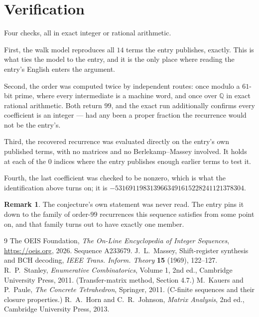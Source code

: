 \documentclass[11pt,a4paper]{article}
\theoremstyle{plain}
\theoremstyle{definition}
\newtheorem{remark}[theorem]{Remark}
\begin{document}
\section{Verification}

Four checks, all in exact integer or rational arithmetic.

First, the walk model reproduces all $14$ terms the entry publishes, exactly. This is
what ties the model to the entry, and it is the only place where reading the entry's English
enters the argument.

Second, the order was computed twice by independent routes: once modulo a $61$-bit prime, where
every intermediate is a machine word, and once over $\mathbb{Q}$ in exact rational arithmetic.
Both return $99$, and the exact run additionally confirms every coefficient is an integer
--- had any been a proper fraction the recurrence would not be the entry's.

Third, the recovered recurrence was evaluated directly on the entry's own published terms, with
no matrices and no Berlekamp--Massey involved. It holds at each of the $0$ indices where
the entry publishes enough earlier terms to test it.

Fourth, the last coefficient was checked to be nonzero, which is what the identification above
turns on; it is $-5316911983139663491615228241121378304$.

\begin{remark}
The conjecture's own statement was never read. The entry pins it down to the family of
order-$99$ recurrences this sequence satisfies from some point on, and that family turns
out to have exactly one member.
\end{remark}

\begin{thebibliography}{9}
 The OEIS Foundation, \emph{The On-Line Encyclopedia of Integer
Sequences}, \url{https://oeis.org}, 2026. Sequence A233679.
 J.~L.~Massey, Shift-register synthesis and BCH decoding, \emph{IEEE
Trans. Inform. Theory} \textbf{15} (1969), 122--127.
 R.~P.~Stanley, \emph{Enumerative Combinatorics}, Volume 1, 2nd ed.,
Cambridge University Press, 2011. (Transfer-matrix method, Section 4.7.)
 M.~Kauers and P.~Paule, \emph{The Concrete Tetrahedron}, Springer, 2011.
(C-finite sequences and their closure properties.)
 R.~A.~Horn and C.~R.~Johnson, \emph{Matrix Analysis}, 2nd ed., Cambridge
University Press, 2013.
\end{thebibliography}
\end{document}
